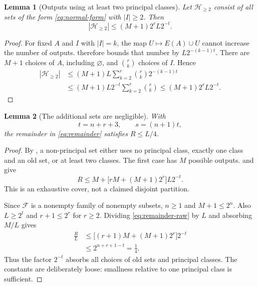\documentclass[11pt]{article}
\newtheorem{lemma}[lemma]{Lemma}
\newcommand{\<}{\langle}
\renewcommand{\>}{\rangle}
\newcommand{\F}{\mathcal{F}}
\newcommand{\Hh}{\mathcal{H}}
\numberwithin{equation}{section}
\begin{document}
\begin{lemma}[Outputs using at least two principal classes]\label{lem:several-classes-old}
Let $\Hh_{\ge2}$ consist of all sets of the form \eqref{eq:normal-form}
with $|I|\ge2$. Then
\begin{equation}\label{eq:several-bound}
 |\Hh_{\ge2}|\le(M+1)2^rL2^{-t}.
\end{equation}
\end{lemma}
\begin{proof}
For fixed $A$ and $I$ with $|I|=k$, the map $U\mapsto E(A)\cup U$ cannot
increase the number of outputs.  therefore bounds
that number by $L2^{-(k-1)t}$. There are $M+1$ choices of $A$, including
$\varnothing$, and $\binom rk$ choices of $I$. Hence
\[
 \begin{split}
 |\Hh_{\ge2}|
 &\le(M+1)L\sum_{k=2}^r\binom rk2^{-(k-1)t}\\
 &\le(M+1)L2^{-t}\sum_{k=2}^r\binom rk
 \le(M+1)2^rL2^{-t}.
 \end{split}
\]
\end{proof}

\begin{lemma}[The additional sets are negligible]\label{lem:remainder-small}
With
\begin{equation}\label{eq:parameters}
 t=n+r+3,\qquad s=(n+1)t,
\end{equation}
the remainder in \eqref{eq:remainder} satisfies $R\le L/4$.
\end{lemma}
\begin{proof}
By , a non-principal set either uses no principal
class, exactly one class and an old set, or at least two classes. The first
case has $M$ possible outputs. 
and  give
\begin{equation}\label{eq:remainder-raw}
 R\le M+\bigl[rM+(M+1)2^r\bigr]L2^{-t}.
\end{equation}
This is an exhaustive cover, not a claimed disjoint partition.

Since $\F$ is a nonempty family of nonempty subsets, $n\ge1$ and $M+1\le2^n$.
Also $L\ge2^t$ and $r+1\le2^r$ for $r\ge2$. Dividing
\eqref{eq:remainder-raw} by $L$ and absorbing $M/L$ gives
\[
 \begin{split}
 \frac RL
 &\le\bigl[(r+1)M+(M+1)2^r\bigr]2^{-t}\\
 &\le2^{n+r+1-t}=\frac14.
 \end{split}
\]
Thus the factor $2^{-t}$ absorbs all choices of old sets and principal
classes. The constants are deliberately loose: smallness relative to one
principal class is sufficient.
\end{proof}
\end{document}
